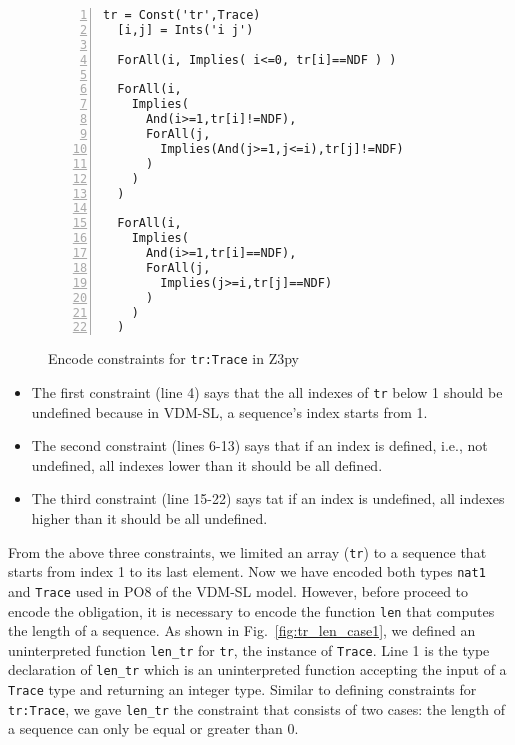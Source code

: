 \begin{figure}[t]
\begin{center}
\begin{mdframed}[roundcorner=5pt,shadow=true]
\begin{Verbatim}[fontsize=\small,numbers=left]
  tr = Const('tr',Trace)
  [i,j] = Ints('i j')

  ForAll(i, Implies( i<=0, tr[i]==NDF ) )

  ForAll(i,
    Implies(
      And(i>=1,tr[i]!=NDF),
      ForAll(j,
        Implies(And(j>=1,j<=i),tr[j]!=NDF)
      )
    )
  )

  ForAll(i,
    Implies(
      And(i>=1,tr[i]==NDF),
      ForAll(j,
        Implies(j>=i,tr[j]==NDF)
      )
    )
  )
\end{Verbatim}
\end{mdframed}
\vspace{-10pt}
\caption{Encode constraints for {\tt tr:Trace} in Z3py}
\label{fig:tr_constraint_case1}
\end{center}
\end{figure}



\begin{itemize}
\item
The first constraint (line 4) says that the all indexes of {\tt tr} below 1 should be undefined because in VDM-SL, a sequence's index starts from 1.
\item
The second constraint (lines 6-13) says that if an index is defined, i.e., not undefined, all indexes lower than it should be all defined.
\item
The third constraint (line 15-22) says tat if an index is undefined, all indexes higher than it should be all undefined.
\end{itemize}

From the above three constraints, we limited an array ({\tt tr}) to a sequence that starts from index 1 to its last element. Now we have encoded both types {\tt nat1} and {\tt Trace} used in PO8 of the VDM-SL model. However, before proceed to encode the obligation, it is necessary to encode the function {\tt len} that computes the length of a sequence. As shown in Fig.~\ref{fig:tr_len_case1}, we defined an uninterpreted function {\tt len\_tr} for {\tt tr}, the instance of {\tt Trace}. Line 1 is the type declaration of {\tt len\_tr} which is an uninterpreted function accepting the input of a {\tt Trace} type and returning an integer type. Similar to defining constraints for {\tt tr:Trace}, we gave {\tt len\_tr} the constraint that consists of two cases: the length of a sequence can only be equal or greater than 0.

